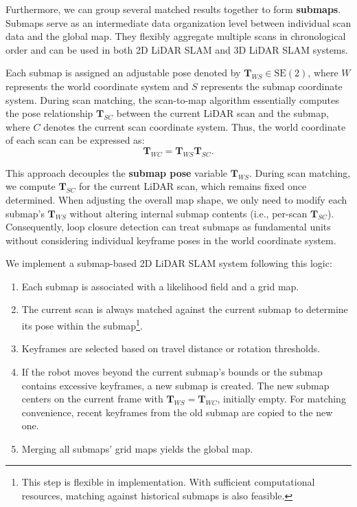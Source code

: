 Furthermore, we can group several matched results together to form \textbf{submaps}. Submaps serve as an intermediate data organization level between individual scan data and the global map. They flexibly aggregate multiple scans in chronological order and can be used in both 2D LiDAR SLAM and 3D LiDAR SLAM systems.  

Each submap is assigned an adjustable pose denoted by $\mathbf{T}_{WS} \in \mathrm{SE}(2)$, where $W$ represents the world coordinate system and $S$ represents the submap coordinate system. During scan matching, the scan-to-map algorithm essentially computes the pose relationship $\mathbf{T}_{SC}$ between the current LiDAR scan and the submap, where $C$ denotes the current scan coordinate system. Thus, the world coordinate of each scan can be expressed as:  
\begin{equation}\label{key}  
\mathbf{T}_{WC} = \mathbf{T}_{WS} \mathbf{T}_{SC}.  
\end{equation}  

This approach decouples the \textbf{submap pose} variable $\mathbf{T}_{WS}$. During scan matching, we compute $\mathbf{T}_{SC}$ for the current LiDAR scan, which remains fixed once determined. When adjusting the overall map shape, we only need to modify each submap's $\mathbf{T}_{WS}$ without altering internal submap contents (i.e., per-scan $\mathbf{T}_{SC}$). Consequently, loop closure detection can treat submaps as fundamental units without considering individual keyframe poses in the world coordinate system.  

We implement a submap-based 2D LiDAR SLAM system following this logic:  
\begin{enumerate}  
	\item Each submap is associated with a likelihood field and a grid map.  
	\item The current scan is always matched against the current submap to determine its pose within the submap\footnote{This step is flexible in implementation. With sufficient computational resources, matching against historical submaps is also feasible.}.  
	\item Keyframes are selected based on travel distance or rotation thresholds.  
	\item If the robot moves beyond the current submap's bounds or the submap contains excessive keyframes, a new submap is created. The new submap centers on the current frame with $\mathbf{T}_{WS} = \mathbf{T}_{WC}$, initially empty. For matching convenience, recent keyframes from the old submap are copied to the new one.  
	\item Merging all submaps' grid maps yields the global map.  
\end{enumerate}  

